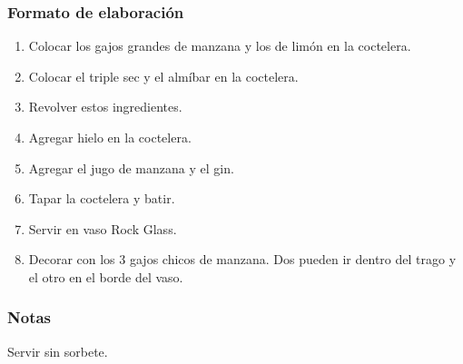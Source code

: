 \subsubsection{Formato de elaboraci\'on} 
\label{sec:title}
\bigskip 
\begin{center}
\begin{enumerate}
\item Colocar los gajos grandes de manzana y los de lim\'on en la coctelera.
\item Colocar el triple sec y el alm\'ibar en la coctelera.
\item Revolver estos ingredientes.
\item Agregar hielo en la coctelera.
\item Agregar el jugo de manzana y el gin.
\item Tapar la coctelera y batir.
\item Servir en vaso Rock Glass.
\item Decorar con los 3 gajos chicos de manzana. Dos pueden ir dentro del trago y el otro en el borde del vaso.
\end{enumerate}
\end{center}
\bigskip 
\bigskip 

\subsubsection{Notas}
\bigskip 
\begin{center}
\raggedright{}Servir sin sorbete.
\end{center} 

\bigskip
\medskip 
\medskip


